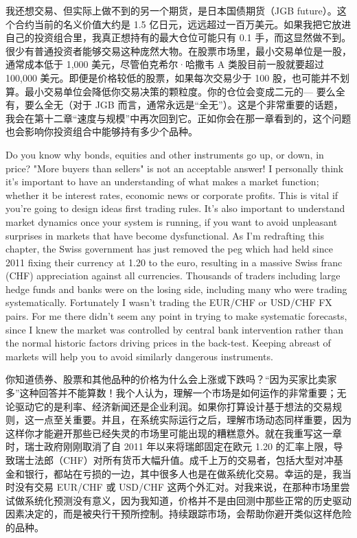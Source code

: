 \begin{chineseblock}我还想交易、但实际上做不到的另一个期货，是日本国债期货（JGB future）。这个合约当前的名义价值大约是 1.5 亿日元，远远超过一百万美元。如果我把它放进自己的投资组合里，我真正想持有的最大仓位可能只有 0.1 手，而这显然做不到。很少有普通投资者能够交易这种庞然大物。在股票市场里，最小交易单位是一股，通常成本低于 1,000 美元，尽管伯克希尔·哈撒韦 A 类股目前一股就要超过 100,000 美元。即便是价格较低的股票，如果每次交易少于 100 股，也可能并不划算。最小交易单位会降低你交易决策的颗粒度。你的仓位会变成二元的--- 要么全有，要么全无（对于 JGB 而言，通常永远是“全无”）。这是个非常重要的话题，我会在第十二章“速度与规模”中再次回到它。正如你会在那一章看到的，这个问题也会影响你投资组合中能够持有多少个品种。\end{chineseblock}


\begin{englishblock} Do you know why bonds, equities and other instruments go up, or down, in price? "More buyers than sellers" is not an acceptable answer! I personally think it's important to have an understanding of what makes a market function; whether it be interest rates, economic news or corporate profits. This is vital if you're going to design ideas first trading rules. It's also important to understand market dynamics once your system is running, if you want to avoid unpleasant surprises in markets that have become dysfunctional. As I'm redrafting this chapter, the Swiss government has just removed the peg which had held since 2011 fixing their currency at 1.20 to the euro, resulting in a massive Swiss franc (CHF) appreciation against all currencies. Thousands of traders including large hedge funds and banks were on the losing side, including many who were trading systematically. Fortunately I wasn't trading the EUR/CHF or USD/CHF FX pairs. For me there didn't seem any point in trying to make systematic forecasts, since I knew the market was controlled by central bank intervention rather than the normal historic factors driving prices in the back-test. Keeping abreast of markets will help you to avoid similarly dangerous instruments. \end{englishblock}

\begin{chineseblock}你知道债券、股票和其他品种的价格为什么会上涨或下跌吗？“因为买家比卖家多”这种回答并不能算数！我个人认为，理解一个市场是如何运作的非常重要；无论驱动它的是利率、经济新闻还是企业利润。如果你打算设计基于想法的交易规则，这一点至关重要。并且，在系统实际运行之后，理解市场动态同样重要，因为这样你才能避开那些已经失灵的市场里可能出现的糟糕意外。就在我重写这一章时，瑞士政府刚刚取消了自 2011 年以来将瑞郎固定在欧元 1.20 的汇率上限，导致瑞士法郎（CHF）对所有货币大幅升值。成千上万的交易者，包括大型对冲基金和银行，都站在亏损的一边，其中很多人也是在做系统化交易。幸运的是，我当时没有交易 EUR/CHF 或 USD/CHF 这两个外汇对。对我来说，在那种市场里尝试做系统化预测没有意义，因为我知道，价格并不是由回测中那些正常的历史驱动因素决定的，而是被央行干预所控制。持续跟踪市场，会帮助你避开类似这样危险的品种。\end{chineseblock}

